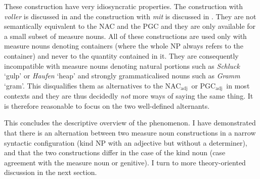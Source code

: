 \documentclass[USenglish]{article}
\newcommand{\Sub}[1]{\ensuremath{\mathrm{_{#1}}}}
\newcommand{\NACa}{NAC\Sub{adj}}
\newcommand{\PGCa}{PGC\Sub{adj}}
\begin{document}
\begin{exe}
  \ex\label{ex:alternatives}
  \begin{xlist}
  \end{xlist}
\end{exe}

These construction have very idiosyncratic properties.
The construction with \textit{voller} is discussed in \cite{Zeldes2018} and the construction with \textit{mit} is discussed in \cite{Bhatt1990}.
They are not semantically equivalent to the NAC and the PGC and they are only available for a small subset of measure nouns.
All of these constructions are used only with measure nouns denoting containers (where the whole NP always refers to the container) and never to the quantity contained in it.
They are consequently incompatible with measure nouns denoting natural portions such as \textit{Schluck} `gulp' or \textit{Haufen} `heap' and strongly grammaticalised nouns such as \textit{Gramm} `gram'.
This disqualifies them as alternatives to the \NACa\ or \PGCa\ in most contexts and they are thus decidedly \textit{not} more ways of saying the same thing. 
It is therefore reasonable to focus on the two well-defined alternants.

This concludes the descriptive overview of the phenomenon.
I have demonstrated that there is an alternation between two measure noun constructions in a narrow syntactic configuration (kind NP with an adjective but without a determiner), and that the two constructions differ in the case of the kind noun (case agreement with the measure noun or genitive).
I turn to more theory-oriented discussion in the next section.


\end{document}
